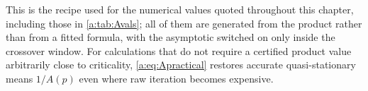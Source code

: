 This is the recipe used for the numerical values quoted throughout this chapter,
including those in \cref{a:tab:Avals}; all of them are generated from the product
rather than from a fitted formula, with the asymptotic switched on only inside the
crossover window. For calculations that do not require a certified product value
arbitrarily close to criticality, \cref{a:eq:Apractical} restores accurate
quasi-stationary means $1/A(p)$ even where raw iteration becomes expensive.

\FloatBarrier
